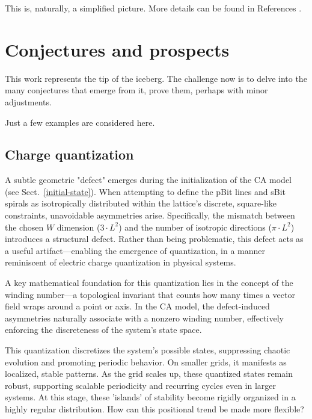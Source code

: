 \documentclass[12pt]{article}
\begin{document}
This is, naturally, a simplified picture. More details can be found in References \cite{thooft,Elze2019,rizzo2020perturbing}.


\section{Conjectures and prospects\label{sec:Prospects-and-conjectures}}

This work represents the tip of the iceberg. The challenge now is to delve into the many conjectures that emerge from it, prove them, perhaps with minor adjustments.

Just a few examples are considered here.

\subsection{Charge quantization} \label{subsec:charge-quantization}

A subtle geometric "defect" emerges during the initialization of the CA model (see Sect.~\ref{initial-state}). When attempting to define the pBit lines and sBit spirals as isotropically distributed within the lattice's discrete, square-like constraints, unavoidable asymmetries arise. Specifically, the mismatch between the chosen $W  $ dimension ($3\cdot L^2$) and the number of isotropic directions ($\pi\cdot L^2$) introduces a structural defect. Rather than being problematic, this defect acts as a useful artifact—enabling the emergence of quantization, in a manner reminiscent of electric charge quantization in physical systems.

A key mathematical foundation for this quantization lies in the concept of the winding number—a topological invariant that counts how many times a vector field wraps around a point or axis. In the CA model, the defect-induced asymmetries naturally associate with a nonzero winding number, effectively enforcing the discreteness of the system’s state space.

This quantization discretizes the system's possible states, suppressing chaotic evolution and promoting periodic behavior. On smaller grids, it manifests as localized, stable patterns. As the grid scales up, these quantized states remain robust, supporting scalable periodicity and recurring cycles even in larger systems. At this stage, these 'islands' of stability become rigidly organized in a highly regular distribution. How can this positional trend be made more flexible?
\end{document}
